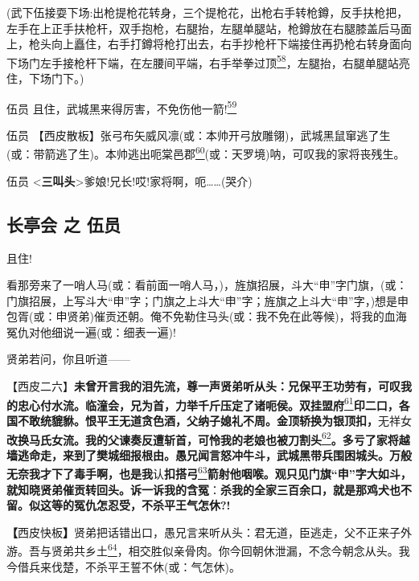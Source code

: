 (武下伍接耍下场:出枪提枪花转身，三个提枪花，出枪右手转枪鐏，反手扶枪把，左手在上正手扶枪杆，双手抱枪，右腿抬，左腿单腿站，枪鐏放在右腿膝盖后马面上，枪头向上矗住，右手打鐏将枪打出去，右手抄枪杆下端接住再扔枪右转身面向下场门左手接枪杆下端，在左腰间平端，右手举拳过顶\protect\hyperlink{fn58}{\textsuperscript{58}}，左腿抬，右腿单腿站亮住，下场门下。)

伍员
且住，武城黑来得厉害，不免伤他一箭!\protect\hyperlink{fn59}{\textsuperscript{59}}

伍员
【西皮散板】张弓布矢威风凛(或：本帅开弓放雕翎)，武城黑鼠窜逃了生(或：带箭逃了生)。本帅逃出呃棠邑郡\protect\hyperlink{fn60}{\textsuperscript{60}}(或：天罗境)呐，可叹我的家将丧残生。

伍员
\textless{}\textbf{三叫头}\textgreater{}爹娘!兄长!哎!家将啊，呃\ldots{}\ldots{}(哭介)

\hypertarget{ux957fux4eadux4f1a-ux4e4b-ux4f0dux5458}{%
\subsection{长亭会 之
伍员}\label{ux957fux4eadux4f1a-ux4e4b-ux4f0dux5458}}

且住!

看那旁来了一哨人马(或：看前面一哨人马，)，旌旗招展，斗大``申''字门旗，(或：门旗招展，上写斗大``申''字；门旗之上斗大``申''字；旌旗之上斗大``申''字，)想是申包胥(或：申贤弟)催贡还朝。俺不免勒住马头(或：我不免在此等候)，将我的血海冤仇对他细说一遍(或：细表一遍)!

贤弟若问，你且听道------

【西皮二六】\textbf{未曾开言我的泪先流，尊一声贤弟听从头：兄保平王功劳有，可叹我的忠心付水流。临潼会，兄为首，力举千斤压定了诸呃侯。双挂盟府}\protect\hyperlink{fn61}{\textsuperscript{61}}\textbf{印二口，各国不敢统貔貅。恨平王无道贪色酒，父纳子媳礼不周。金顶轿换为银顶扣，}无祥女\textbf{改换马氏女流。我的父谏奏反遭斩首，可怜我的老娘也被刀割头}\protect\hyperlink{fn62}{\textsuperscript{62}}\textbf{。多亏了家将越墙逃命走，来到了樊城细报根由。愚兄闻言怒冲牛斗，武城黑带兵围困城头。万般无奈我才下了毒手啊，也是我}认\textbf{扣搭弓}\protect\hyperlink{fn63}{\textsuperscript{63}}\textbf{箭射他咽喉。观只见门旗``申''字大如斗，就知晓贤弟催贡转回头。诉一诉我的含冤}：\textbf{杀我的全家三百余口，就是那鸡犬也不留。似这等的冤仇怎忍受，不杀平王气怎休​?!}

\textbf{【}西皮快板\textbf{】}贤弟把话错出口，愚兄言来听从头：君无道，臣逃走，父不正来子外游。吾与贤弟共乡土\protect\hyperlink{fn64}{\textsuperscript{64}}，相交胜似亲骨肉。你今回朝休泄漏，不念今朝念从头。我今借兵来伐楚，不杀平王誓不休(或：气怎休)。

